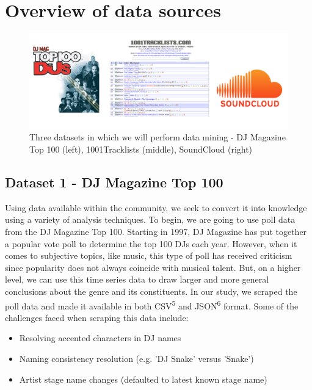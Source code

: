 \documentclass[12pt]{dalcsthesis}
\begin{document}
\chapter{Overview of data sources}

\begin{figure}[h]
\includegraphics[scale=.50]{sources}
\centering
\caption{Three datasets in which we will perform data mining - DJ Magazine Top 100 (left), 1001Tracklists (middle), SoundCloud (right)}
\end{figure}

\section{Dataset 1 - DJ Magazine Top 100}

Using data available within the community, we seek to convert it into knowledge using a variety of analysis techniques. To begin, we are going to use poll data from the DJ Magazine Top 100. Starting in 1997, DJ Magazine has put together a popular vote poll to determine the top 100 DJs each year. However, when it comes to subjective topics, like music, this type of poll has received criticism since popularity does not always coincide with musical talent. But, on a higher level, we can use this time series data to draw larger and more general conclusions about the genre and its constituents. In our study, we scraped the poll data and made it available in both CSV\textsuperscript{5} and JSON\textsuperscript{6} format. Some of the challenges faced when scraping this data include: 

\begin{itemize}
  \item Resolving accented characters in DJ names
  \item Naming consistency resolution (e.g. 'DJ Snake' versus 'Snake')
  \item Artist stage name changes (defaulted to latest known stage name)
\end{itemize}
\end{document}
